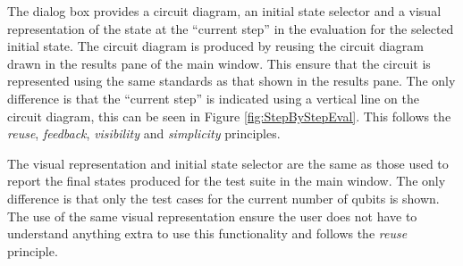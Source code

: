 The dialog box provides a circuit diagram, an initial state selector and a visual representation of the state at the ``current step'' in the evaluation for the selected initial state.
The circuit diagram is produced by reusing the circuit diagram drawn in the results pane of the main window.
This ensure that the circuit is represented using the same standards as that shown in the results pane.
The only difference is that the ``current step'' is indicated using a vertical line on the circuit diagram, this can be seen in Figure \ref{fig:StepByStepEval}.
This follows the \emph{reuse}, \emph{feedback},  \emph{visibility} and \emph{simplicity} principles.

The visual representation and initial state selector are the same as those used to report the final states produced for the test suite in the main window.
The only difference is that only the test cases for the current number of qubits is shown.
The use of the same visual representation ensure the user does not have to understand anything extra to use this functionality and follows the \emph{reuse} principle.




